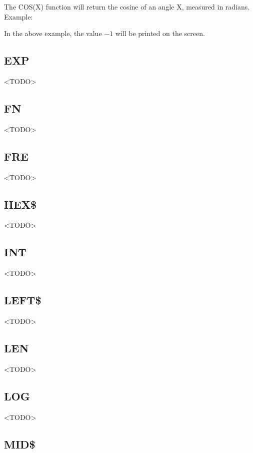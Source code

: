 The {\ttfamily COS(X)} function will return the cosine of an angle {\ttfamily
X}, measured in radians.\\

Example:\\

In the above example, the value $-1$ will be printed on the screen.

\subsection{EXP}

<TODO>

\subsection{FN}

<TODO>

\subsection{FRE}

<TODO>

\subsection{HEX\$}

<TODO>

\subsection{INT}

<TODO>

\subsection{LEFT\$}

<TODO>

\subsection{LEN}

<TODO>

\subsection{LOG}

<TODO>

\subsection{MID\$}

